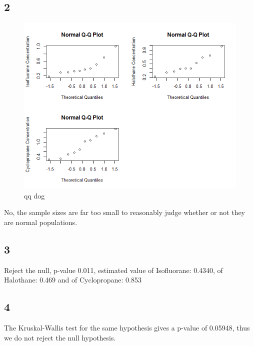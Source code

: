 \documentclass{article}
\begin{document}
    \subsection*{2}
    \begin{figure}[!htb]
    \centering
      \includegraphics[scale=0.6]{../results/4_2.png}
      \caption{qq dog}
      \label{fig:qq dog}
    \end{figure}
    
    No, the sample sizes are far too small to reasonably judge whether or not they are normal populations.
    \subsection*{3}
    Reject the null, p-value 0.011, estimated value of Isofluorane: 0.4340, of Halothane: 0.469 and of Cyclopropane: 0.853
    \subsection*{4}
    The Kruskal-Wallis test for the same hypothesis gives a p-value of 0.05948, thus we do not reject the null hypothesis. 
\end{document}
